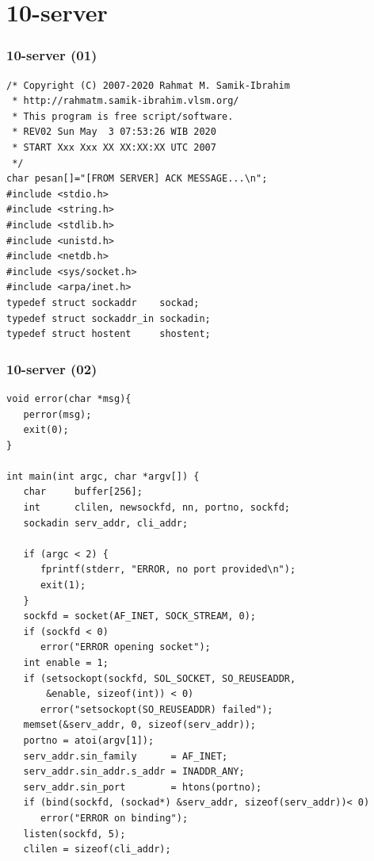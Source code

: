 \documentclass[aspectratio=169, xcolor=table, notheorems, hyperref={pdfpagelabels=false}]{beamer}
\begin{document}
\section{10-server}
\begin{frame}[fragile]
\frametitle{10-server (01)}
\begin{lstlisting}[basicstyle=\ttfamily\footnotesize]
/* Copyright (C) 2007-2020 Rahmat M. Samik-Ibrahim
 * http://rahmatm.samik-ibrahim.vlsm.org/
 * This program is free script/software.
 * REV02 Sun May  3 07:53:26 WIB 2020
 * START Xxx Xxx XX XX:XX:XX UTC 2007
 */
char pesan[]="[FROM SERVER] ACK MESSAGE...\n";
#include <stdio.h>
#include <string.h>
#include <stdlib.h>
#include <unistd.h>
#include <netdb.h>
#include <sys/socket.h>
#include <arpa/inet.h>
typedef struct sockaddr    sockad;
typedef struct sockaddr_in sockadin;
typedef struct hostent     shostent;

\end{lstlisting}
\end{frame}

\begin{frame}[fragile]
\frametitle{10-server (02)}
\begin{lstlisting}[basicstyle=\ttfamily\tiny]
void error(char *msg){
   perror(msg);
   exit(0);
}

int main(int argc, char *argv[]) {
   char     buffer[256];
   int      clilen, newsockfd, nn, portno, sockfd;
   sockadin serv_addr, cli_addr;

   if (argc < 2) {
      fprintf(stderr, "ERROR, no port provided\n");
      exit(1);
   }
   sockfd = socket(AF_INET, SOCK_STREAM, 0);
   if (sockfd < 0)
      error("ERROR opening socket");
   int enable = 1;
   if (setsockopt(sockfd, SOL_SOCKET, SO_REUSEADDR, 
       &enable, sizeof(int)) < 0)
      error("setsockopt(SO_REUSEADDR) failed");
   memset(&serv_addr, 0, sizeof(serv_addr));
   portno = atoi(argv[1]);
   serv_addr.sin_family      = AF_INET;
   serv_addr.sin_addr.s_addr = INADDR_ANY;
   serv_addr.sin_port        = htons(portno);
   if (bind(sockfd, (sockad*) &serv_addr, sizeof(serv_addr))< 0)
      error("ERROR on binding");
   listen(sockfd, 5);
   clilen = sizeof(cli_addr);

\end{lstlisting}
\end{frame}
\end{document}
